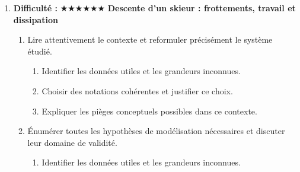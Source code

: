 \documentclass[11pt,a4paper]{article}
\newcommand{\etoiles}[1]{\textbf{Difficulté : }#1}
\begin{document}
\begin{enumerate}[label=\textbf{Très long \arabic*.},leftmargin=*]
\begin{enumerate}[label=\textbf{\arabic*)}]
\begin{enumerate}[label=\alph*)]
\item Discuter la robustesse du résultat face à une variation de paramètre.
\item Proposer une ouverture vers une situation réelle plus complexe.
\end{enumerate}
\item Imaginer un protocole expérimental ou numérique permettant de confronter le modèle à des mesures.
\begin{enumerate}[label=\alph*)]
\item Comparer au moins deux scénarios différents.
\item Discuter la robustesse du résultat face à une variation de paramètre.
\item Proposer une ouverture vers une situation réelle plus complexe.
\end{enumerate}
\item Rédiger une conclusion scientifique : résultats, limites, prolongements vers la Terminale ou au-delà.
\begin{enumerate}[label=\alph*)]
\item Comparer au moins deux scénarios différents.
\item Discuter la robustesse du résultat face à une variation de paramètre.
\item Proposer une ouverture vers une situation réelle plus complexe.
\end{enumerate}
\end{enumerate}
\item \etoiles{★★★★★★}
\textbf{Descente d'un skieur : frottements, travail et dissipation}
\begin{enumerate}[label=\textbf{\arabic*)}]
\item Lire attentivement le contexte et reformuler précisément le système étudié.
\begin{enumerate}[label=\alph*)]
\item Identifier les données utiles et les grandeurs inconnues.
\item Choisir des notations cohérentes et justifier ce choix.
\item Expliquer les pièges conceptuels possibles dans ce contexte.
\end{enumerate}
\item Énumérer toutes les hypothèses de modélisation nécessaires et discuter leur domaine de validité.
\begin{enumerate}[label=\alph*)]
\item Identifier les données utiles et les grandeurs inconnues.

\end{enumerate}
\end{enumerate}
\end{enumerate}
\end{document}
